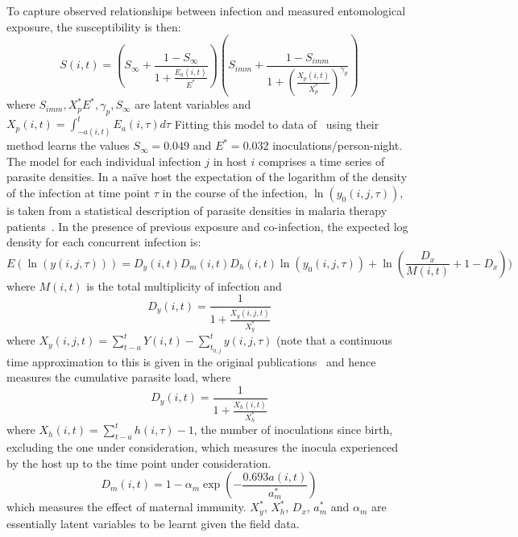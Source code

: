 \documentclass{article}
\begin{document}
To capture observed relationships between infection and measured entomological exposure, the susceptibility is then:
\begin{equation}
  S(i,t) = (S_{\infty} + \frac{1 - S_{\infty}}{1 + \frac{E_a(i,t)}{E^{*}}})(S_{imm} + \frac{1 - S_{imm}}{1 + (\frac{X_p(i,t)}{X_{p}^{*}})^{\gamma_p}})
\end{equation}
where $S_{imm}, X^{*}_{p} E^*, \gamma_p, S_\infty$ are latent variables
and $X_p(i,t) = \int^{t}_{-a(i,t)} E_{a}(i,\tau) d\tau$
Fitting this model to data of~\cite{beier1994plasmodium} using their method learns the values $S_{\infty} = 0.049$ and $E^* = 0.032$ 
inoculations/person-night. 
The model for each individual infection $j$ in host $i$ comprises a time series of parasite densities.
  In a naïve host the expectation of the logarithm of the density of the infection at time point $\tau$
in the course of the infection, $\ln(y_0(i,j,\tau))$, is taken from a statistical description of parasite densities
in malaria therapy patients~\cite{maire2006model}. 
In the presence of previous exposure and co-infection, the expected log density for each concurrent infection is: 
\begin{equation}
  E(\ln(y(i,j,\tau))) = D_{y}(i,t)D_{m}(i,t)D_{h}(i,t)\ln(y_0(i,j,\tau)) + \ln(\frac{D_x}{M(i,t)} + 1 - D_x))
\end{equation}
where $M(i,t)$ is the total multiplicity of infection and 
\begin{equation}
  D_{y}(i,t) = \frac{1}{1 + \frac{X_y(i,j,t)}{X^{*}_{y}}}
\end{equation}
where $X_y(i,j,t) = \sum^{t}_{t-a}Y(i,t) - \sum^{t}_{t_{0,j}} y(i,j,\tau)$ (note that a continuous time approximation to this
is given in the original publications~\cite{smith2006mathematical,maire2006model}
and hence measures the cumulative parasite load, where
\begin{equation}
  D_{y}(i,t) = \frac{1}{1 + \frac{X_{h}(i,t)}{X^{*}_h}}
\end{equation}
where $X_h(i,t) = \sum^{t}_{t-a}h(i,\tau) - 1$, the number of inoculations since birth, excluding
the one under consideration, which measures the inocula experienced by the host
up to the time point under consideration. 
\begin{equation}
  D_{m}(i,t) = 1 - \alpha_m \exp(-\frac{0.693a(i,t)}{a^{*}_m})
\end{equation}
which measures the effect of maternal immunity. 
$X^{*}_{y}$, $X^{*}_h$, $D_x$, $a^*_{m}$ and $\alpha_m$ are essentially 
latent variables to be learnt given the field data. 
\end{document}
